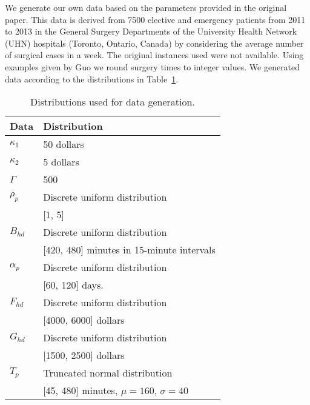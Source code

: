 We generate our own data based on the parameters provided in the original paper. This data is derived from 7500 elective and emergency patients from 2011 to 2013 in the General Surgery Departments of the University Health Network (UHN) hospitals (Toronto, Ontario, Canada) by considering the average number of surgical cases in a week\cite{roshanaei2017propagating}. The original instances used were not available. Using examples given by Guo\cite{guo} we round surgery times to integer values. We generated data according to the distributions in Table~\ref{tab:dataDist}.

\begin{table}[H]
    \centering
    \caption{Distributions used for data generation.}\label{tab:dataDist}
    \begin{tabular}{ll} \toprule
        Data & Distribution \\\midrule
        $\kappa_1$ & 50 dollars \\
        $\kappa_2$ & 5 dollars \\
        $\Gamma$ & 500 \\
        $\rho_p$ & Discrete uniform distribution \\ 
        & [1, 5]  \\ 
        $B_{hd}$ & Discrete uniform distribution \\ & [420, 480] minutes \quad in 15-minute intervals \\
        $\alpha_p$ & Discrete uniform distribution \\ 
        & [60, 120] days. \\
        $F_{hd}$ & Discrete uniform distribution \\ 
        & [4000, 6000] dollars \\ 
        $G_{hd}$ & Discrete uniform distribution \\ 
        & [1500, 2500] dollars \\ 
        $T_p$ & Truncated normal distribution \\ 
        & [45, 480] minutes, \quad $\mu=160$, $\sigma=40$ \\
        \bottomrule
    \end{tabular}
\end{table}